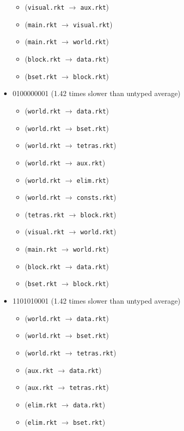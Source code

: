 \documentclass{article}
\newcommand{\mono}[1]{\texttt{#1}}
\begin{document}
\begin{itemize}
\begin{itemize}
  \item (\mono{visual.rkt} $\rightarrow$ \mono{aux.rkt})
  \item (\mono{main.rkt} $\rightarrow$ \mono{visual.rkt})
  \item (\mono{main.rkt} $\rightarrow$ \mono{world.rkt})
  \item (\mono{block.rkt} $\rightarrow$ \mono{data.rkt})
  \item (\mono{bset.rkt} $\rightarrow$ \mono{block.rkt})
  \end{itemize}
\item 0100000001 (1.42 times slower than untyped average)
  \begin{itemize}
  \item (\mono{world.rkt} $\rightarrow$ \mono{data.rkt})
  \item (\mono{world.rkt} $\rightarrow$ \mono{bset.rkt})
  \item (\mono{world.rkt} $\rightarrow$ \mono{tetras.rkt})
  \item (\mono{world.rkt} $\rightarrow$ \mono{aux.rkt})
  \item (\mono{world.rkt} $\rightarrow$ \mono{elim.rkt})
  \item (\mono{world.rkt} $\rightarrow$ \mono{consts.rkt})
  \item (\mono{tetras.rkt} $\rightarrow$ \mono{block.rkt})
  \item (\mono{visual.rkt} $\rightarrow$ \mono{world.rkt})
  \item (\mono{main.rkt} $\rightarrow$ \mono{world.rkt})
  \item (\mono{block.rkt} $\rightarrow$ \mono{data.rkt})
  \item (\mono{bset.rkt} $\rightarrow$ \mono{block.rkt})
  \end{itemize}
\item 1101010001 (1.42 times slower than untyped average)
  \begin{itemize}
  \item (\mono{world.rkt} $\rightarrow$ \mono{data.rkt})
  \item (\mono{world.rkt} $\rightarrow$ \mono{bset.rkt})
  \item (\mono{world.rkt} $\rightarrow$ \mono{tetras.rkt})
  \item (\mono{aux.rkt} $\rightarrow$ \mono{data.rkt})
  \item (\mono{aux.rkt} $\rightarrow$ \mono{tetras.rkt})
  \item (\mono{elim.rkt} $\rightarrow$ \mono{data.rkt})
  \item (\mono{elim.rkt} $\rightarrow$ \mono{bset.rkt})

\end{itemize}
\end{itemize}
\end{document}
